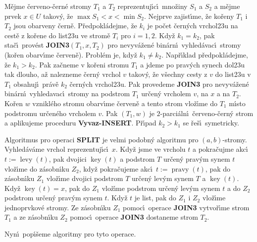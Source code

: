 \documentclass[a4paper,12pt]{article}
\DeclareMathOperator*{\levy}{levy}
\DeclareMathOperator*{\pravy}{pravy}
\DeclareMathOperator*{\key}{key}
\begin{document}
\flushpar M\v ejme \v cerveno-\v cern\'e stromy $T_1$ a $T_2$ reprezentuj\'\i c\'\i\ 
mno\v ziny $S_1$ a $S_2$ a m\v ejme prvek $x\in U$ takov\'y, \v ze 
$\max S_1<x<\min S_2$.  Nejprve zajist\'\i me, \v ze ko\v reny $T_
1$ i $T_2$ jsou 
obarveny \v cern\v e.  P\v redpokl\'adejme, \v ze $k_i$ je po\v cet \v cern\'ych 
vrchol\accent23u na cest\v e z ko\v rene do list\accent23u ve strom\v e 
$T_i$ pro $i=1,2$.  Kdy\v z $k_1=k_2$, pak sta\v c\'\i\ prov\'est {\bf JOIN3$
(T_1,x,T_2)$ }
pro nevyv\'a\v zen\'e bin\'arn\'\i\ vyhled\'avac\'\i\ stromy (ko\v ren obarv\'\i me 
\v cerven\v e).  Probl\'em je, kdy\v z $k_1\ne k_2$.  Nap\v r\'\i klad 
p\v redpokl\'adejme, \v ze $k_1>k_2$.  Pak za\v cneme v ko\v reni stromu $
T_1$ a 
jdeme po prav\'ych synech dol\accent23u tak dlouho, a\v z nalezneme 
\v cern\'y vrchol $v$ takov\'y, \v ze v\v sechny cesty z $v$ do list\accent23u 
v $T_1$ obsahuj\'\i\ pr\'av\v e $k_2$ \v cern\'ych vrchol\accent23u.  Pak 
provedeme {\bf JOIN3} pro nevyv\'a\v zen\'e bin\'arn\'\i\ vyhledavac\'\i\ stromy 
na podstrom $T_1$ ur\v cen\'y vrcholem $v$, na $x$ a na $T_2$. Ko\v ren $
w$ 
vznikl\'eho stromu obarv\'\i me \v cerven\v e a tento strom vlo\v z\'\i me do 
$T_1$ m\'\i sto podstromu ur\v cen\'eho vrcholem $v$. Pak $(T_1,w
)$ je 
$2$-parci\'aln\'\i\ \v cerveno-\v cern\'y strom a aplikujeme proceduru 
{\bf Vyvaz-INSERT}. P\v r\'\i pad $k_2>k_1$ se \v re\v s\'\i\ symetricky. 
\medskip

\flushpar Algoritmus pro operaci {\bf SPLIT} je velmi podobn\'y 
algoritmu pro $(a,b)$-stromy. Vy\-hled\'av\'a\-me vrchol 
reprezentuj\'\i c\'\i\ $x$. Kdy\v z jsme ve vrcholu $t$ a pokra\v cujme akc\'\i\ 
$t:=\levy(t)$, pak dvojici $\key(t)$ a podstrom $T$ ur\v cen\'y prav\'ym 
synem $t$ vlo\v z\'\i me do z\'asobn\'\i ku $Z_2$, kdy\v z pokra\v cujeme akc\'\i\ 
$t:=\pravy(t)$, pak do z\'asobn\'\i ku $Z_1$ vlo\v z\'\i me dvojici podstrom $
T$ 
ur\v cen\'y lev\'ym synem $T$ a $\key(t)$. Kdy\v z $\key(t)=x$, pak do $
Z_1$ 
vlo\v z\'\i me podstrom ur\v cen\'y lev\'ym synem $t$ a do $Z_2$ podstrom 
ur\v cen\'y prav\'ym synem $t$. Kdy\v z $t$ je list, pak do $Z_1$ i $
Z_2$ vlo\v z\'\i me 
jednoprvkov\'e stromy. Ze z\'asobn\'\i ku $Z_1$ pomoc\'\i\ operace {\bf JOIN3 }
vytvo\v r\'\i me strom $T_1$ a ze z\'asobn\'\i ku $Z_2$ pomoc\'\i\ operace {\bf JOIN3 }
dostaneme strom $T_2$. 
\medskip

\flushpar Nyn\'\i\ pop\'\i\v seme algoritmy pro tyto operace.
\medskip
\end{document}
